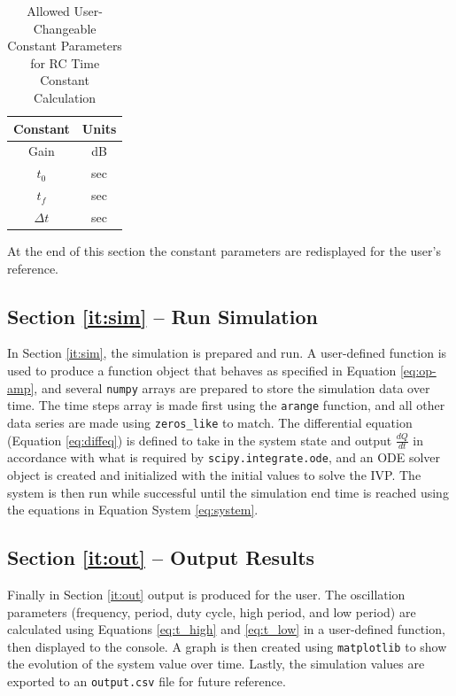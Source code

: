 \documentclass[12pt]{article}
\begin{document}
\begin{spreadlines}{1ex}
\begin{table}[h]
    \centering
    \caption{Allowed User-Changeable Constant Parameters for RC Time Constant Calculation}\vspace{2mm}
    \begin{tabular}{c|c}
    Constant &  Units\\
    \hline
    Gain        & dB\\
    $t_0$       & sec\\
    $t_f$       & sec\\
    $\Delta t$  & sec
    \end{tabular}
    \label{tab:RC_allowed_consts}
\end{table}
\end{spreadlines}
\noindent
At the end of this section the constant parameters are redisplayed for the user's reference.

\subsection{Section \ref{it:sim} -- Run Simulation}
In Section \ref{it:sim}, the simulation is prepared and run. A user-defined function is used to produce a function object that behaves as specified in Equation \ref{eq:op-amp}, and several \texttt{numpy} arrays are prepared to store the simulation data over time. The time steps array is made first using the \texttt{arange} function, and all other data series are made using \texttt{zeros\_like} to match. The differential equation (Equation \ref{eq:diffeq}) is defined to take in the system state and output $\frac{dQ}{dt}$ in accordance with what is required by \texttt{scipy.integrate.ode}, and an ODE solver object is created and initialized with the initial values to solve the IVP. The system is then run while successful until the simulation end time is reached using the equations in Equation System \ref{eq:system}.

\subsection{Section \ref{it:out} -- Output Results}
Finally in Section \ref{it:out} output is produced for the user.  The oscillation parameters (frequency, period, duty cycle, high period, and low period) are calculated using Equations \ref{eq:t_high} and \ref{eq:t_low} in a user-defined function, then displayed to the console. A graph is then created using \texttt{matplotlib} to show the evolution of the system value over time. Lastly, the simulation values are exported to an \texttt{output.csv} file for future reference.
\end{document}
